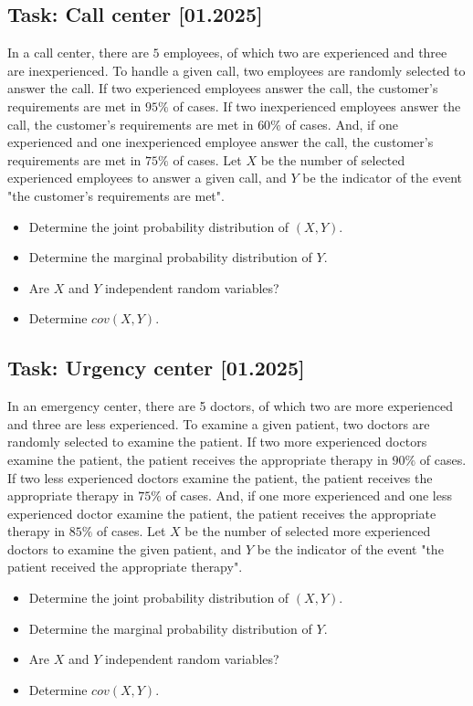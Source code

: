 \documentclass[a4paper, 12pt]{article}
\begin{document}
\subsection*{Task: Call center [01.2025]}

In a call center, there are $5$ employees, of which two are experienced and three are inexperienced. To handle a given call, two employees are randomly selected to answer the call. If two experienced employees answer the call, the customer's requirements are met in $95\%$ of cases. If two inexperienced employees answer the call, the customer's requirements are met in $60\%$ of cases. And, if one experienced and one inexperienced employee answer the call, the customer's requirements are met in $75\%$ of cases. Let $X$ be the number of selected experienced employees to answer a given call, and $Y$ be the indicator of the event "the customer's requirements are met".

\begin{itemize}
    \item [a)] Determine the joint probability distribution of $(X, Y)$.
    \item [b)] Determine the marginal probability distribution of $Y$.
    \item [c)] Are $X$ and $Y$ independent random variables?
    \item [d)] Determine $cov(X, Y)$.
\end{itemize}


\subsection*{Task: Urgency center [01.2025]}

In an emergency center, there are 5 doctors, of which two are more experienced and three are less experienced. To examine a given patient, two doctors are randomly selected to examine the patient. If two more experienced doctors examine the patient, the patient receives the appropriate therapy in $90\%$ of cases. If two less experienced doctors examine the patient, the patient receives the appropriate therapy in $75\%$ of cases. And, if one more experienced and one less experienced doctor examine the patient, the patient receives the appropriate therapy in $85\%$ of cases. Let $X$ be the number of selected more experienced doctors to examine the given patient, and $Y$ be the indicator of the event "the patient received the appropriate therapy".

\begin{itemize}
    \item [a)] Determine the joint probability distribution of $(X, Y)$.
    \item [b)] Determine the marginal probability distribution of $Y$.
    \item [c)] Are $X$ and $Y$ independent random variables?
    \item [d)] Determine $cov(X, Y)$.
\end{itemize}
\end{document}
